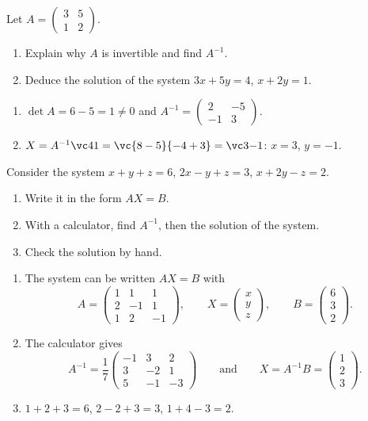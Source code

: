 \begin{exercise}
Let $A=\begin{pmatrix}3&5\\1&2\end{pmatrix}$.
\begin{enumerate}
\item Explain why $A$ is invertible and find $A^{-1}$.
\item Deduce the solution of the system $3x+5y=4$, $x+2y=1$.
\end{enumerate}
\end{exercise}
\begin{solution}
\begin{enumerate}
\item $\det A=6-5=1\neq0$ and $A^{-1}=\begin{pmatrix}2&-5\\-1&3\end{pmatrix}$.
\item $X=A^{-1}\vc41=\vc{8-5}{-4+3}=\vc3{-1}$: $x=3$, $y=-1$.
\end{enumerate}
\end{solution}

\begin{exercise}
Consider the system $x+y+z=6$, $2x-y+z=3$, $x+2y-z=2$.
\begin{enumerate}
\item Write it in the form $AX=B$.
\item With a calculator, find $A^{-1}$, then the solution of the system.
\item Check the solution by hand.
\end{enumerate}
\end{exercise}
\begin{solution}
\begin{enumerate}
\item The system can be written $AX=B$ with \[A=\begin{pmatrix}1&1&1\\2&-1&1\\1&2&-1\end{pmatrix},\qquad X=\begin{pmatrix}x\\y\\z\end{pmatrix},\qquad B=\begin{pmatrix}6\\3\\2\end{pmatrix}.\]
\item The calculator gives \[A^{-1}=\frac17\begin{pmatrix}-1&3&2\\3&-2&1\\5&-1&-3\end{pmatrix}\qquad\text{and}\qquad X=A^{-1}B=\begin{pmatrix}1\\2\\3\end{pmatrix}.\]
\item $1+2+3=6$, $2-2+3=3$, $1+4-3=2$.
\end{enumerate}
\end{solution}

